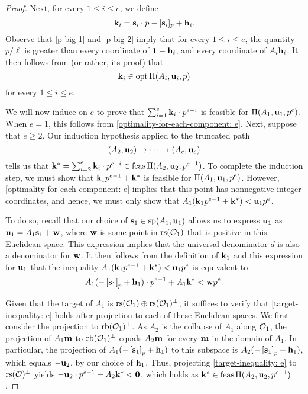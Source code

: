 \documentclass[11pt]{amsart}
\newcommand{\denom}{d}
\begin{document}
\begin{proof}
Next, for every $1 \leq i \leq e$,  we define
  \[
\mathbf{k}_i = \mathbf{s}_i \cdot p - [\mathbf{s}_i]_p + \mathbf{h}_i.
\]
Observe that \eqref{p-big-1} and \eqref{p-big-2} imply that for every $1 \leq i \leq e$, the quantity $p/\ell$ is greater than every coordinate of $\mathbf{1}-\mathbf{h}_i$, and every coordinate of $A_i \mathbf{h}_i$.  It then follows from  (or rather, its proof) that
\begin{equation}
\label{optimality-for-each-component: e}
\mathbf{k}_i \in \operatorname{opt} \Pi(A_i, \mathbf{u}_i,p)
\end{equation}
for every $1 \leq i \leq e$.

We will now induce on $e$ to prove that $\sum_{i=1}^e \mathbf{k}_i \cdot p^{e-i}$ is feasible for $\Pi(A_1, \mathbf{u}_1, p^e)$.  When $e = 1$, this follows from \eqref{optimality-for-each-component: e}.  Next, suppose that $e \geq 2$.  Our induction hypothesis applied to the truncated path
\[ (A_2, \mathbf{u}_2) \to \cdots \to (A_e, \mathbf{u}_e) \]
%
tells us that $\mathbf{k}^{\ast} = \sum_{i=2}^e \mathbf{k}_i \cdot p^{e-i} \in \operatorname{feas} \Pi(A_2, \mathbf{u}_2, p^{e-1})$.  To complete the induction step, we must show that $\mathbf{k}_1 p^{e-1} + \mathbf{k}^{\ast}$ is feasible for $\Pi(A_1, \mathbf{u}_1, p^e)$.  However,  \eqref{optimality-for-each-component: e} implies that this point has nonnegative integer coordinates, and hence, we must only show that $A_1 ( \mathbf{k}_1 p^{e-1} + \mathbf{k}^{\ast} ) < \mathbf{u}_1 p^e$.

To do so,  recall that our choice of $\mathbf{s}_1 \in \operatorname{sp}(A_1, \mathbf{u}_1)$ allows us to express $\mathbf{u}_1$ as
$\mathbf{u}_1 = A_1 \mathbf{s}_1 + \mathbf{w}$, where $\mathbf{w}$ is some point in $\operatorname{rs}(\mathcal{O}_1)$ that is positive in this Euclidean space.  This expression implies that the universal denominator $\denom$ is also a denominator for $\mathbf{w}$.  It then follows from the definition of $\mathbf{k}_1$ and this expression for $\mathbf{u}_1$ that the inequality $A_1 ( \mathbf{k}_1 p^{e-1} + \mathbf{k}^{\ast} ) < \mathbf{u}_1 p^e$ is equivalent to
%
\begin{equation}
\label{target-inequality: e}
  A_1( - \left[ \mathbf{s}_1 \right]_p + \mathbf{h}_1 ) \cdot p^{e-1} + A_1\mathbf{k}^{\ast} < \mathbf{w} p^e.
\end{equation}

Given that the target of $A_1$ is $\operatorname{rs}(\mathcal{O}_1) \oplus \operatorname{rs}(\mathcal{O}_1)^{\perp}$, it suffices to verify that \eqref{target-inequality: e} holds after projection to each of these Euclidean spaces.  We first consider the projection to $\operatorname{rb}(\mathcal{O}_1)^{\perp}$.  As $A_2$ is the collapse of $A_1$ along $\mathcal{O}_1$, the projection of $A_1 \mathbf{m}$ to $\operatorname{rb}(\mathcal{O}_1)^{\perp}$ equals $A_2 \mathbf{m}$ for every $\mathbf{m}$ in the domain of $A_1$.  In particular, the projection of $A_1( - \left[ \mathbf{s}_1 \right]_p + \mathbf{h}_1 )$ to this subspace is $A_2 ( - \left[ \mathbf{s}_1 \right]_p + \mathbf{h}_1 )$, which equals $-\mathbf{u}_2$, by our choice of $\mathbf{h}_1$.  Thus, projecting \eqref{target-inequality: e} to $\operatorname{rs}(\mathcal{O})^{\perp}$ yields $-\mathbf{u}_2 \cdot p^{e-1} + A_2 \mathbf{k}^{\ast} < \mathbf{0}$, which holds as $\mathbf{k}^{\ast} \in \operatorname{feas} \Pi(A_2, \mathbf{u}_2, p^{e-1})$.


\end{proof}
\end{document}
